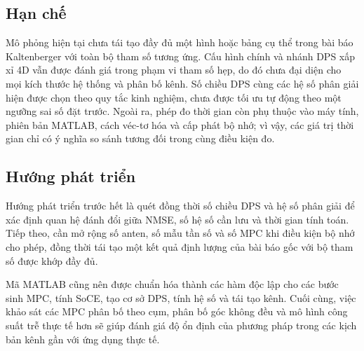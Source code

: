 \subsection*{Hạn chế}

Mô phỏng hiện tại chưa tái tạo đầy đủ một hình hoặc bảng cụ thể trong bài báo Kaltenberger với toàn bộ tham số tương ứng. Cấu hình chính và nhánh DPS xấp xỉ 4D vẫn được đánh giá trong phạm vi tham số hẹp, do đó chưa đại diện cho mọi kích thước hệ thống và phân bố kênh. Số chiều DPS cùng các hệ số phân giải hiện được chọn theo quy tắc kinh nghiệm, chưa được tối ưu tự động theo một ngưỡng sai số đặt trước. Ngoài ra, phép đo thời gian còn phụ thuộc vào máy tính, phiên bản MATLAB, cách véc-tơ hóa và cấp phát bộ nhớ; vì vậy, các giá trị thời gian chỉ có ý nghĩa so sánh tương đối trong cùng điều kiện đo.

\subsection*{Hướng phát triển}

Hướng phát triển trước hết là quét đồng thời số chiều DPS và hệ số phân giải để xác định quan hệ đánh đổi giữa NMSE, số hệ số cần lưu và thời gian tính toán. Tiếp theo, cần mở rộng số anten, số mẫu tần số và số MPC khi điều kiện bộ nhớ cho phép, đồng thời tái tạo một kết quả định lượng của bài báo gốc với bộ tham số được khớp đầy đủ.

Mã MATLAB cũng nên được chuẩn hóa thành các hàm độc lập cho các bước sinh MPC, tính SoCE, tạo cơ sở DPS, tính hệ số và tái tạo kênh. Cuối cùng, việc khảo sát các MPC phân bố theo cụm, phân bố góc không đều và mô hình công suất trễ thực tế hơn sẽ giúp đánh giá độ ổn định của phương pháp trong các kịch bản kênh gần với ứng dụng thực tế.

\cleardoublepage
